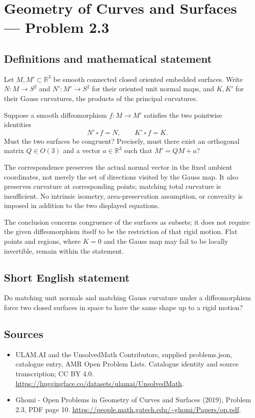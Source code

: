 \documentclass[11pt,a4paper]{article}
\begin{document}
\section*{Geometry of Curves and Surfaces — Problem 2.3}\label{statement}

\subsection{Definitions and mathematical statement}
Let $M,M'\subset\mathbb R^3$ be smooth connected closed oriented
embedded surfaces. Write $N:M\to S^2$ and $N':M'\to S^2$ for
their oriented unit normal maps, and $K,K'$ for their Gauss
curvatures, the products of the principal curvatures.

Suppose a smooth diffeomorphism $f:M\to M'$ satisfies the two
pointwise identities
\[
                         N'\circ f=N,\qquad K'\circ f=K.
\]
Must the two surfaces be congruent? Precisely, must there exist
an orthogonal matrix $Q\in O(3)$ and a vector $a\in\mathbb R^3$
such that $M'=QM+a$?

The correspondence preserves the actual normal vector in the
fixed ambient coordinates, not merely the set of directions
visited by the Gauss map. It also preserves curvature at
corresponding points; matching total curvature is insufficient.
No intrinsic isometry, area-preservation assumption, or convexity
is imposed in addition to the two displayed equations.

The conclusion concerns congruence of the surfaces as subsets;
it does not require the given diffeomorphism itself to be the
restriction of that rigid motion. Flat points and regions, where
$K=0$ and the Gauss map may fail to be locally invertible, remain
within the statement.
\subsection{Short English statement}
Do matching unit normals and matching Gauss curvature under a
diffeomorphism force two closed surfaces in space to have the
same shape up to a rigid motion?
\subsection{Sources}
\begin{itemize}
\item[S1] ULAM.AI and the UnsolvedMath Contributors, supplied problems.json, catalogue entry, AMR Open Problem Lists. Catalogue identity and source transcription; CC BY 4.0.
\url{https://huggingface.co/datasets/ulamai/UnsolvedMath}.
\item[S2] Ghomi - Open Problems in Geometry of Curves and Surfaces (2019), Problem 2.3, PDF page 10. 
\url{https://people.math.gatech.edu/~ghomi/Papers/op.pdf}.
\end{itemize}
\end{document}
